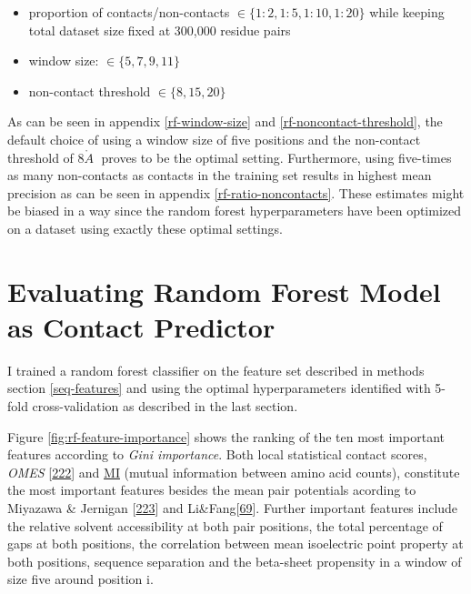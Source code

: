 \documentclass[11pt,a4paper,twoside]{book}
\providecommand{\tightlist}{%
  \setlength{\itemsep}{0pt}\setlength{\parskip}{0pt}}
\newcommand{\angstrom}{\mathring{A} \;}
\theoremstyle{definition}
\theoremstyle{definition}
\theoremstyle{remark}
\begin{document}
\begin{itemize}
\tightlist
\item
  proportion of contacts/non-contacts
  \(\in \{1\!:\!2, 1\!:\!5, 1\!:\!10, 1\!:\!20 \}\) while keeping total
  dataset size fixed at 300,000 residue pairs
\item
  window size: \(\in \{5, 7, 9, 11\}\)
\item
  non-contact threshold \(\in \{8, 15, 20\}\)
\end{itemize}

As can be seen in appendix \ref{rf-window-size} and
\ref{rf-noncontact-threshold}, the default choice of using a window size
of five positions and the non-contact threshold of \(8 \angstrom\)
proves to be the optimal setting. Furthermore, using five-times as many
non-contacts as contacts in the training set results in highest mean
precision as can be seen in appendix \ref{rf-ratio-noncontacts}. These
estimates might be biased in a way since the random forest
hyperparameters have been optimized on a dataset using exactly these
optimal settings.

\section{Evaluating Random Forest Model as Contact
Predictor}\label{evaluating-random-forest-model-as-contact-predictor}

I trained a random forest classifier on the feature set described in
methods section \ref{seq-features} and using the optimal hyperparameters
identified with 5-fold cross-validation as described in the last
section.

Figure \ref{fig:rf-feature-importance} shows the ranking of the ten most
important features according to \emph{Gini importance}. Both local
statistical contact scores, \emph{OMES}
{[}\protect\hyperlink{ref-Fodor2004a}{222}{]} and
\protect\hyperlink{abbrev}{MI} (mutual information between amino acid
counts), constitute the most important features besides the mean pair
potentials acording to Miyazawa \& Jernigan
{[}\protect\hyperlink{ref-Miyazawa1999a}{223}{]} and
Li\&Fang{[}\protect\hyperlink{ref-Li2011}{69}{]}. Further important
features include the relative solvent accessibility at both pair
positions, the total percentage of gaps at both positions, the
correlation between mean isoelectric point property at both positions,
sequence separation and the beta-sheet propensity in a window of size
five around position i.
\end{document}
